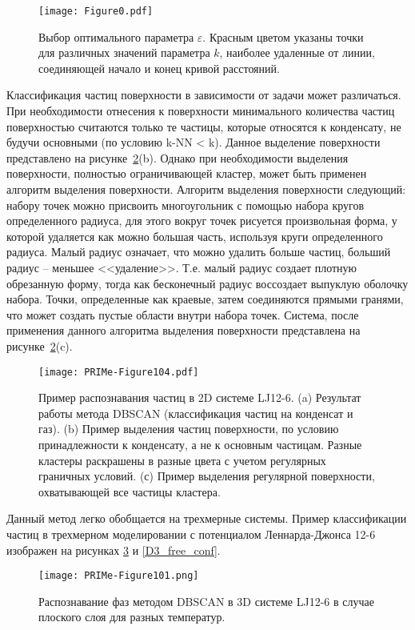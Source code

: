 \begin{figure}[!t]
  \centering
  \texttt{[image: Figure0.pdf]}
  \caption{Выбор оптимального параметра $\varepsilon$.
    Красным цветом указаны точки для различных значений параметра $k$, наиболее удаленные от линии, соединяющей начало и конец кривой расстояний.}
  \label{epsilon_k}
\end{figure}

Классификация частиц поверхности в зависимости от задачи может различаться.
При необходимости отнесения к поверхности минимального количества частиц поверхностью считаются только те частицы, которые относятся к конденсату, не будучи основными (по условию k-NN < k).
Данное выделение поверхности представлено на рисунке~\ref{DBSCAN-Illustr}(b).
Однако при необходимости выделения поверхности, полностью ограничивающей кластер, может быть применен алгоритм выделения поверхности.
Алгоритм выделения поверхности следующий: набору точек можно присвоить многоугольник с помощью набора кругов определенного радиуса, для этого вокруг точек рисуется произвольная форма, у которой удаляется как можно большая часть, используя круги определенного радиуса.
Малый радиус означает, что можно удалить больше частиц, больший радиус -- меньшее <<удаление>>.
Т.е. малый радиус создает плотную обрезанную форму, тогда как бесконечный радиус воссоздает выпуклую оболочку набора.
Точки, определенные как краевые, затем соединяются прямыми гранями, что может создать пустые области внутри набора точек.
Система, после применения данного алгоритма выделения поверхности представлена на рисунке~\ref{DBSCAN-Illustr}(c).

\begin{figure}[!t]
  \centering
  \texttt{[image: PRIMe-Figure104.pdf]}
  \caption{Пример распознавания частиц в 2D системе LJ12-6. 
    (a) Результат работы метода DBSCAN (классификация частиц на конденсат и газ). 
    (b) Пример выделения частиц поверхности, по условию принадлежности к конденсату, а не к основным частицам.
    Разные кластеры раскрашены в разные цвета с учетом регулярных граничных условий. 
    (с) Пример выделения регулярной поверхности, охватывающей все частицы кластера.}
  \label{DBSCAN-Illustr}
\end{figure}

Данный метод легко обобщается на трехмерные системы.
Пример классификации частиц в трехмерном моделировании с потенциалом Леннарда-Джонса 12-6 изображен на рисунках \ref{D3_flat_layer} и \ref{D3_free_conf}.

\begin{figure}[!t]
  \centering
  \texttt{[image: PRIMe-Figure101.png]}
  \caption{Распознавание фаз методом DBSCAN в 3D системе LJ12-6 в случае плоского слоя для разных температур.}
  \label{D3_flat_layer}
\end{figure}


